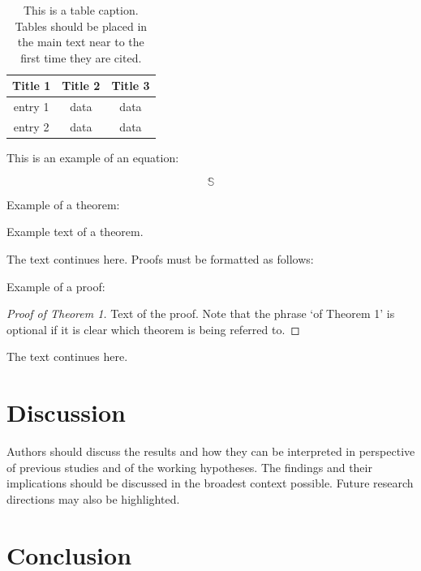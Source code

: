 \documentclass[ijerph,article,accept,moreauthors,pdftex]{mdpi}
\begin{document}
\begin{table}[H]
\caption{This is a table caption. Tables should be placed in the main text near to the first time they are cited.}
\centering
\begin{tabular}{ccc}
\toprule
\textbf{Title 1}    & \textbf{Title 2}  & \textbf{Title 3}\\
\midrule
entry 1     & data          & data\\
entry 2     & data          & data\\
\bottomrule
\end{tabular}
\end{table}

This is an example of an equation:

\begin{equation}
\mathbb{S}
\end{equation}

Example of a theorem:

\begin{Theorem}
Example text of a theorem.
\end{Theorem}

The text continues here. Proofs must be formatted as follows:

Example of a proof:

\begin{proof}[Proof of Theorem 1]
Text of the proof. Note that the phrase `of Theorem 1' is optional if it is clear which theorem is being referred to.
\end{proof}

The text continues here.

\hypertarget{discussion}{%
\section{Discussion}\label{discussion}}

Authors should discuss the results and how they can be interpreted in
perspective of previous studies and of the working hypotheses. The
findings and their implications should be discussed in the broadest
context possible. Future research directions may also be highlighted.

\hypertarget{conclusion}{%
\section{Conclusion}\label{conclusion}}
\end{document}
